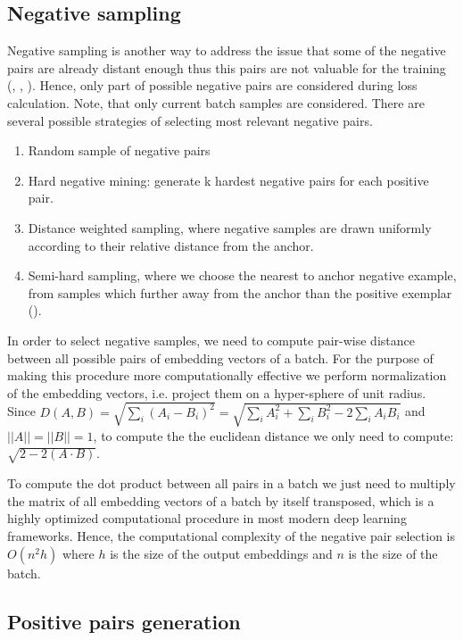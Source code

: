 \documentclass[sigconf, anonymous]{acmart}
\begin{document}
\subsection{Negative sampling} \label{sec-neg-samples}

Negative sampling is another way to address the issue that some of the negative pairs are already distant enough thus this pairs are not valuable for the training (\cite{simo2015discriminative}, \cite{wu2017sampling}, \cite{Schroff2015FaceNetAU}). Hence, only part of possible negative pairs are considered during loss calculation. Note, that only current batch samples are considered. There are several possible strategies of selecting most relevant negative pairs.

\begin{enumerate}
    \item Random sample of negative pairs
    \item Hard negative mining: generate k hardest negative pairs for each positive pair.
    \item Distance weighted sampling, where negative samples are drawn uniformly according to their relative distance from the anchor. \cite{wu2017sampling}
    \item Semi-hard sampling, where we choose the nearest to anchor negative example, from samples which further away from the anchor than the positive exemplar (\cite{Schroff2015FaceNetAU}).
\end{enumerate}

In order to select negative samples, we need to compute pair-wise distance between all possible pairs of embedding vectors of a batch. For the purpose of making this procedure more computationally effective we perform normalization of the embedding vectors, i.e. project them on a hyper-sphere of unit radius. Since $D(A,B) = \sqrt{\sum_i(A_i - B_i)^2} = \sqrt{\sum_i A_i^2 + \sum_i B_i^2 - 2\sum_i A_i B_i} $ and $||A||= ||B||=1$, to compute the the euclidean distance we only need to compute: $\sqrt{2 - 2(A \cdot B)}$.

To compute the dot product between all pairs in a batch we just need to multiply the matrix of all embedding vectors of a batch by itself transposed, which is a highly optimized computational procedure in most modern deep learning frameworks. Hence, the computational complexity of the negative pair selection is $O(n^2h)$ where $h$ is the size of the output embeddings and $n$ is the size of the batch.

\subsection{Positive pairs generation} \label{sec-pos-pairs}
\end{document}
